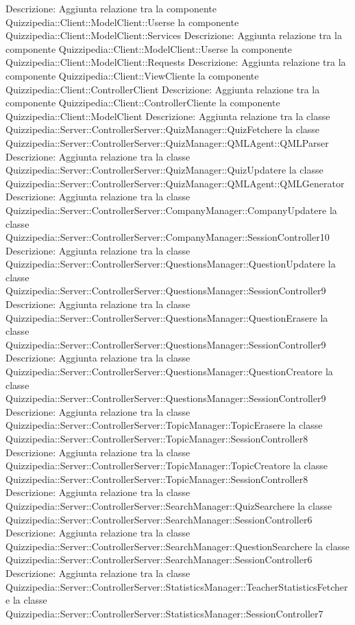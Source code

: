 Descrizione: Aggiunta relazione tra la componente Quizzipedia::Client::ModelClient::Userse la componente Quizzipedia::Client::ModelClient::Services 
Descrizione: Aggiunta relazione tra la componente Quizzipedia::Client::ModelClient::Userse la componente Quizzipedia::Client::ModelClient::Requests 
Descrizione: Aggiunta relazione tra la componente Quizzipedia::Client::ViewCliente la componente Quizzipedia::Client::ControllerClient 
Descrizione: Aggiunta relazione tra la componente Quizzipedia::Client::ControllerCliente la componente Quizzipedia::Client::ModelClient 
Descrizione: Aggiunta relazione tra la classe Quizzipedia::Server::ControllerServer::QuizManager::QuizFetchere la classe Quizzipedia::Server::ControllerServer::QuizManager::QMLAgent::QMLParser 
Descrizione: Aggiunta relazione tra la classe Quizzipedia::Server::ControllerServer::QuizManager::QuizUpdatere la classe Quizzipedia::Server::ControllerServer::QuizManager::QMLAgent::QMLGenerator 
Descrizione: Aggiunta relazione tra la classe Quizzipedia::Server::ControllerServer::CompanyManager::CompanyUpdatere la classe Quizzipedia::Server::ControllerServer::CompanyManager::SessionController10 
Descrizione: Aggiunta relazione tra la classe Quizzipedia::Server::ControllerServer::QuestionsManager::QuestionUpdatere la classe Quizzipedia::Server::ControllerServer::QuestionsManager::SessionController9 
Descrizione: Aggiunta relazione tra la classe Quizzipedia::Server::ControllerServer::QuestionsManager::QuestionErasere la classe Quizzipedia::Server::ControllerServer::QuestionsManager::SessionController9 
Descrizione: Aggiunta relazione tra la classe Quizzipedia::Server::ControllerServer::QuestionsManager::QuestionCreatore la classe Quizzipedia::Server::ControllerServer::QuestionsManager::SessionController9 
Descrizione: Aggiunta relazione tra la classe Quizzipedia::Server::ControllerServer::TopicManager::TopicErasere la classe Quizzipedia::Server::ControllerServer::TopicManager::SessionController8 
Descrizione: Aggiunta relazione tra la classe Quizzipedia::Server::ControllerServer::TopicManager::TopicCreatore la classe Quizzipedia::Server::ControllerServer::TopicManager::SessionController8 
Descrizione: Aggiunta relazione tra la classe Quizzipedia::Server::ControllerServer::SearchManager::QuizSearchere la classe Quizzipedia::Server::ControllerServer::SearchManager::SessionController6 
Descrizione: Aggiunta relazione tra la classe Quizzipedia::Server::ControllerServer::SearchManager::QuestionSearchere la classe Quizzipedia::Server::ControllerServer::SearchManager::SessionController6 
Descrizione: Aggiunta relazione tra la classe Quizzipedia::Server::ControllerServer::StatisticsManager::TeacherStatisticsFetchere la classe Quizzipedia::Server::ControllerServer::StatisticsManager::SessionController7 
